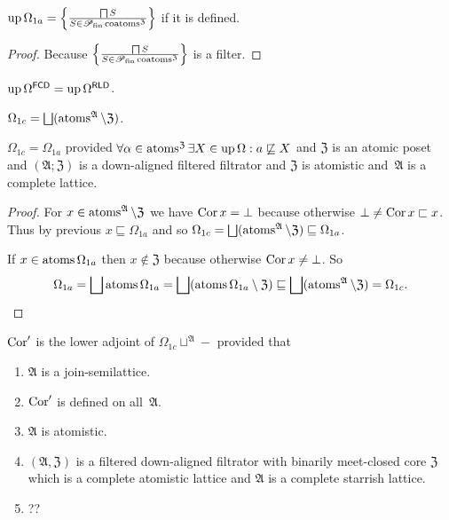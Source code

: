 \begin{prop}
  $\operatorname{up} \Omega_{1a} = \left\{ \frac{ \bigsqcap S }{ S \in
  \mathscr{P}_{\operatorname{fin}} \operatorname{coatoms}^{\mathfrak{Z}} }\right\}$
  if it is defined.
\end{prop}

\begin{proof}
  Because $\left\{ \frac{ \bigsqcap S }{ S \in
  \mathscr{P}_{\operatorname{fin}} \operatorname{coatoms}^{\mathfrak{Z}} }\right\}$ is a
  filter.
\end{proof}

\begin{cor}
  $\operatorname{up} \Omega^{\mathsf{FCD}} = \operatorname{up}
  \Omega^{\mathsf{RLD}}$.
\end{cor}

\begin{defn}
$\Omega_{1c} =
\bigsqcup(\atoms^{\mathfrak{A}}\setminus\mathfrak{Z})$.
\end{defn}

\begin{prop}
$\Omega_{1c} = \Omega_{1a}$ provided
  $\forall \alpha \in \operatorname{atoms}^{\mathfrak{Z}} \exists X \in \operatorname{up}
  \Omega : a \not\sqsubseteq X$ and $\mathfrak{Z}$ is an atomic
  poset and $(\mathfrak{A}; \mathfrak{Z})$ is a down-aligned
  filtered filtrator and $\mathfrak{Z}$ is atomistic and~$\mathfrak{A}$
  is a complete lattice.
\end{prop}

\begin{proof}
For $x\in\operatorname{atoms}^{\mathfrak{A}}\setminus\mathfrak{Z}$ we have
$\operatorname{Cor} x=\bot$ because otherwise $\bot\ne\operatorname{Cor} x\sqsubset x$.
Thus by previous $x\sqsubseteq\Omega_{1a}$ and so
$\Omega_{1c} =
\bigsqcup(\atoms^{\mathfrak{A}}\setminus\mathfrak{Z}) \sqsubseteq
\Omega_{1a}$.

If $x\in\operatorname{atoms}\Omega_{1a}$ then $x\notin\mathfrak{Z}$ because otherwise
$\operatorname{Cor} x\ne\bot$. So \[ \Omega_{1a}=\bigsqcup\atoms \Omega_{1a}=
\bigsqcup(\atoms \Omega_{1a}\setminus\mathfrak{Z})\sqsubseteq
\bigsqcup(\atoms^{\mathfrak{A}}\setminus\mathfrak{Z}) =
\Omega_{1c}. \]
\end{proof}

\begin{thm}
$\operatorname{Cor}'$ is the lower adjoint of
$\Omega_{1c}\sqcup^{\mathfrak{A}}-$
provided that
  \begin{enumerate}
    \item $\mathfrak{A}$ is a join-semilattice.
    \item $\operatorname{Cor}'$ is defined on all~$\mathfrak{A}$.
    \item $\mathfrak{A}$ is atomistic.
    \item $(\mathfrak{A},\mathfrak{Z})$ is a filtered
down-aligned filtrator with binarily meet-closed core $\mathfrak{Z}$
which is a complete atomistic lattice and $\mathfrak{A}$ is a complete
starrish lattice.
    \item ??
  \end{enumerate}
\end{thm}

